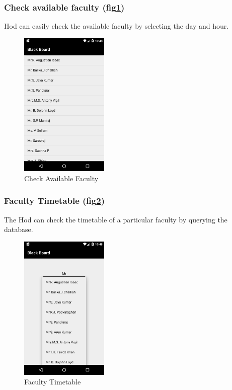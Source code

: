 \documentclass[BTech]{srmuthesis}
\begin{document}
\subsubsection{Check available faculty (fig\ref{fig:available-faculty})}
Hod can easily check the available faculty by selecting the day and hour.
\begin{figure}[htbp]
	\centering
	\includegraphics[width=\linewidth, height=7cm,keepaspectratio]{checkavailability}
\caption{Check Available Faculty}
\label{fig:available-faculty}
\end{figure} 
\subsubsection{Faculty Timetable (fig\ref{fig:faculty-timetable})}
The Hod can check the timetable of a particular faculty by querying the database.
\begin{figure}[htbp]
	\centering
	\includegraphics[width=\linewidth, height=7cm,keepaspectratio]{facultytimetable}
\caption{Faculty Timetable}
\label{fig:faculty-timetable}
\end{figure}
\end{document}
